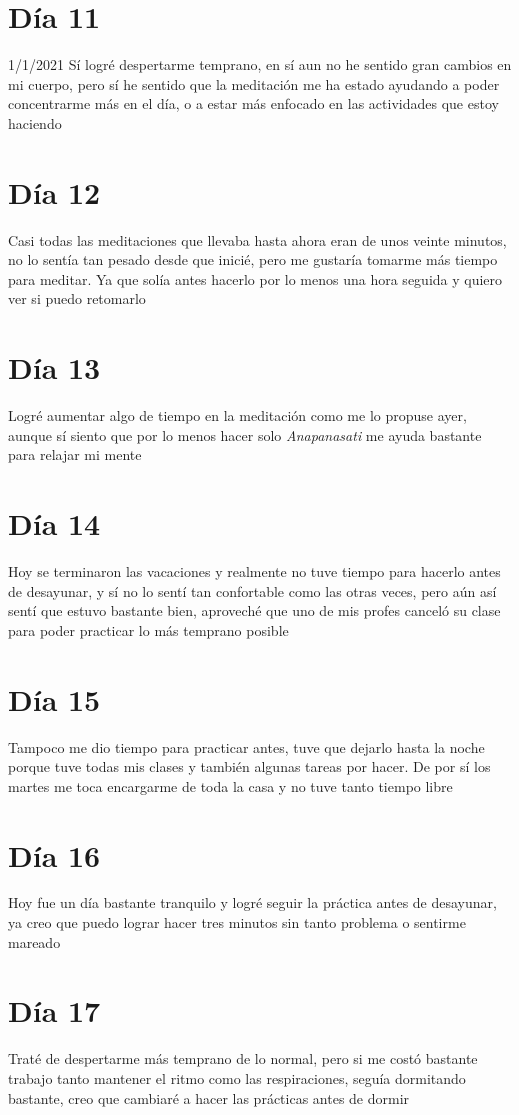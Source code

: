 \documentclass[11pt]{report}
\theoremstyle{plain}
\theoremstyle{definition}
\begin{document}
\section*{Día 11} %
	1/1/2021
	Sí logré despertarme temprano, en sí aun no he sentido gran cambios en mi cuerpo, pero sí he sentido que la meditación me ha estado ayudando a poder concentrarme más en el día, o a estar más enfocado en las actividades que estoy haciendo
\section*{Día 12}%
	Casi todas las meditaciones que llevaba hasta ahora eran de unos veinte minutos, no lo sentía tan pesado desde que inicié, pero me gustaría tomarme más tiempo para meditar. Ya que solía antes hacerlo por lo menos una hora seguida y quiero ver si puedo retomarlo
\section*{Día 13}
	Logré aumentar algo de tiempo en la meditación como me lo propuse ayer, aunque sí siento que por lo menos hacer solo \textit{Anapanasati} me ayuda bastante para relajar mi mente
\section*{Día 14}	
	Hoy se terminaron las vacaciones y realmente no tuve tiempo para hacerlo antes de desayunar, y sí no lo sentí tan confortable como las otras veces, pero aún así sentí que estuvo bastante bien, aproveché que uno de mis profes canceló su clase para poder practicar lo más temprano posible
\section*{Día 15}
	Tampoco me dio tiempo para practicar antes, tuve que dejarlo hasta la noche porque tuve todas mis clases y también algunas tareas por hacer. De por sí los martes me toca encargarme de toda la casa y no tuve tanto tiempo libre
\section*{Día 16}
	Hoy fue un día bastante tranquilo y logré seguir la práctica antes de desayunar, ya creo que puedo lograr hacer tres minutos sin tanto problema o sentirme mareado
\section*{Día 17}
	Traté de despertarme más temprano de lo normal, pero si me costó bastante trabajo tanto mantener el ritmo como las respiraciones, seguía dormitando bastante, creo que cambiaré a hacer las prácticas antes de dormir
\end{document}
